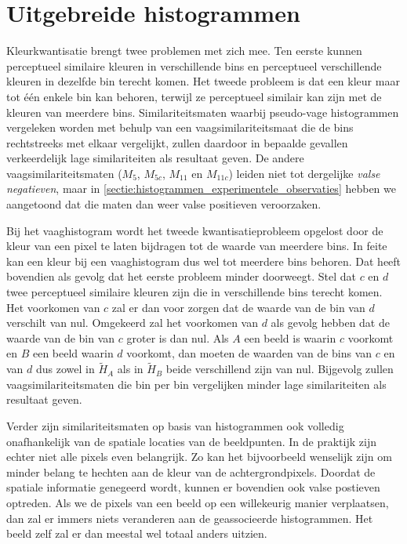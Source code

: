 
\section{Uitgebreide histogrammen}

Kleurkwantisatie brengt twee problemen met zich mee. Ten eerste kunnen 
perceptueel similaire kleuren in verschillende bins en perceptueel 
verschillende kleuren in dezelfde bin terecht komen. Het tweede probleem is dat 
een kleur maar tot \'e\'en enkele bin kan behoren, terwijl ze perceptueel 
similair kan zijn met de kleuren van meerdere bins. Similariteitsmaten waarbij 
pseudo-vage histogrammen vergeleken worden met behulp van een 
vaagsimilariteitsmaat die de bins rechtstreeks met elkaar vergelijkt, zullen 
daardoor in bepaalde gevallen verkeerdelijk lage similariteiten als resultaat 
geven. De andere vaagsimilariteitsmaten ($M_5$, $M_{5c}$, $M_{11}$ en 
$M_{11c}$) leiden niet tot dergelijke \emph{valse negatieven}, maar in 
\ref{sectie:histogrammen_experimentele_observaties} hebben we aangetoond dat 
die maten dan weer valse positieven veroorzaken.

Bij het vaaghistogram wordt het tweede kwantisatieprobleem opgelost
door de kleur van een pixel te laten bijdragen tot de waarde van meerdere bins. In feite kan een kleur
bij een vaaghistogram dus wel tot meerdere bins behoren. Dat heeft
bovendien als gevolg dat het eerste probleem minder doorweegt. Stel dat $c$ en $d$ twee perceptueel
similaire kleuren zijn die in verschillende bins terecht komen. Het
voorkomen van $c$ zal er dan voor zorgen dat de waarde van de bin van $d$ verschilt van nul.
Omgekeerd zal het voorkomen van $d$ als gevolg hebben dat de waarde van de bin van $c$ groter is
dan nul. Als $A$ een beeld is waarin $c$ voorkomt en $B$ een beeld waarin $d$ voorkomt, dan
moeten de waarden van de bins van $c$ en van $d$ dus zowel in $\widetilde{H}_A$ als in 
$\widetilde{H}_B$ beide verschillend zijn van nul. Bijgevolg zullen vaagsimilariteitsmaten
die bin per bin vergelijken minder lage similariteiten als resultaat geven.

Verder zijn similariteitsmaten op basis van histogrammen ook volledig onafhankelijk van de 
spatiale locaties van de beeldpunten. In
de praktijk zijn echter niet alle pixels even belangrijk. Zo kan het
bijvoorbeeld wenselijk zijn om minder belang te hechten aan de kleur van
de achtergrondpixels. Doordat de spatiale informatie genegeerd wordt,
kunnen er bovendien ook valse postieven optreden. Als we de pixels van een
beeld op een willekeurig manier verplaatsen, dan zal er immers niets veranderen aan
de geassocieerde histogrammen. Het beeld zelf zal er dan meestal wel totaal anders uitzien.  

